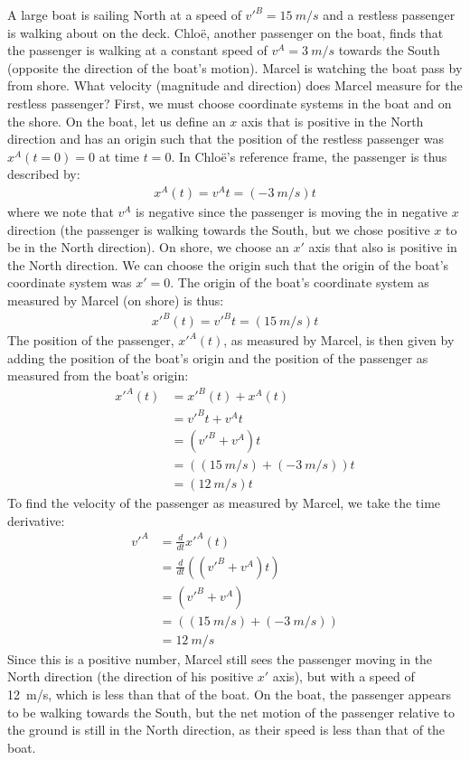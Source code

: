 \begin{example}{A large boat is sailing North at a speed of $v'^B=\SI{15}{m/s}$ and a restless passenger is walking about on the deck. Chlo\"e, another passenger on the boat, finds that the passenger is walking at a constant speed of $v^A=\SI{3}{m/s}$ towards the South (opposite the direction of the boat's motion). Marcel is watching the boat pass by from shore. What velocity (magnitude and direction) does Marcel measure for the restless passenger?}
First, we must choose coordinate systems in the boat and on the shore. On the boat, let us define an $x$ axis that is positive in the North direction and has an origin such that the position of the restless passenger was $x^A(t=0)=0$ at time $t=0$. In Chlo\"e's reference frame, the passenger is thus described by:
\begin{align*}
x^A(t)=v^At=(\SI{-3}{m/s})t
\end{align*}
where we note that $v^A$ is negative since the passenger is moving the in negative $x$ direction (the passenger is walking towards the South, but we chose positive $x$ to be in the North direction). On shore, we choose an $x'$ axis that also is positive in the North direction. We can choose the origin such that the origin of the boat's coordinate system was $x'=0$. The origin of the boat's coordinate system as measured by Marcel (on shore) is thus:
\begin{align*}
x'^B(t)=v'^Bt=(\SI{15}{m/s})t
\end{align*}
The position of the passenger, $x'^A(t)$, as measured by Marcel, is then given by adding the position of the boat's origin and the position of the passenger as measured from the boat's origin:
\begin{align*}
x'^A(t) &= x'^B(t)+x^A(t)\\
&= v'^Bt + v^At \\
&= (v'^B+v^A)t\\
&= ((\SI{15}{m/s})+(\SI{-3}{m/s}))t\\
&= (\SI{12}{m/s})t
\end{align*}
To find the velocity of the passenger as measured by Marcel, we take the time derivative:
\begin{align*}
v'^A &= \frac{d}{dt}x'^A(t)\\
&= \frac{d}{dt} \left((v'^B+v^A)t\right)\\
&=(v'^B+v^A)\\
&=((\SI{15}{m/s})+(\SI{-3}{m/s}))\\
&=\SI{12}{m/s}
\end{align*}
Since this is a positive number, Marcel still sees the passenger moving in the North direction (the direction of his positive $x'$ axis), but with a speed of \SI{12}{m/s}, which is less than that of the boat. On the boat, the passenger appears to be walking towards the South, but the net motion of the passenger relative to the ground is still in the North direction, as their speed is less than that of the boat.
\end{example}


